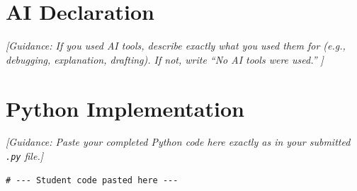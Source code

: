 \documentclass[12pt, letterpaper]{article}
\begin{document}
\section{AI Declaration}
\textit{\textcolor{guidancecolor}{
[Guidance: If you used AI tools, describe exactly what you used them for (e.g., debugging, explanation, drafting). If not, write ``No AI tools were used.'' ]
}}

\appendix
\section{Python Implementation}

\textit{\textcolor{guidancecolor}{
[Guidance: Paste your completed Python code here exactly as in your submitted \texttt{.py} file.]
}}

\begin{lstlisting}[style=pythonstyle, caption={Full Python source code for Assignment 7.}, label={lst:code}]
# --- Student code pasted here ---
\end{lstlisting}
\end{document}
